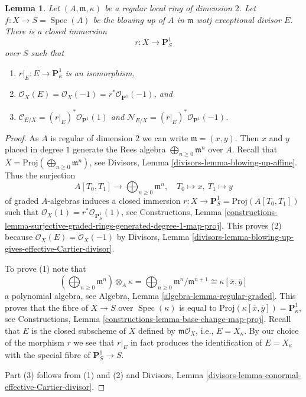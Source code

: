 \documentclass{stacks-project}
\theoremstyle{plain}
\newtheorem{lemma}[subsection]{Lemma}
\theoremstyle{definition}
\theoremstyle{remark}
\numberwithin{equation}{subsection}
\def\Spec{\mathop{\mathrm{Spec}}}
\begin{document}
\begin{lemma}
\label{lemma-blowup}
Let $(A, \mathfrak m, \kappa)$ be a regular local ring of dimension $2$.
Let $f : X \to S = \Spec(A)$ be the blowing up of $A$ in $\mathfrak m$
wotj exceptional divisor $E$. There is a closed immersion
$$
r : X \longrightarrow \mathbf{P}^1_S
$$
over $S$ such that
\begin{enumerate}
\item $r|_E : E \to \mathbf{P}^1_\kappa$ is an isomorphism,
\item $\mathcal{O}_X(E) = \mathcal{O}_X(-1) =
r^*\mathcal{O}_{\mathbf{P}^1}(-1)$, and
\item $\mathcal{C}_{E/X} = (r|_E)^*\mathcal{O}_{\mathbf{P}^1}(1)$ and
$\mathcal{N}_{E/X} = (r|_E)^*\mathcal{O}_{\mathbf{P}^1}(-1)$.
\end{enumerate}
\end{lemma}

\begin{proof}
As $A$ is regular of dimension $2$ we can write $\mathfrak m = (x, y)$.
Then $x$ and $y$ placed in degree $1$ generate the Rees algebra
$\bigoplus_{n \geq 0} \mathfrak m^n$ over $A$. Recall that
$X = \text{Proj}(\bigoplus_{n \geq 0} \mathfrak m^n)$, see
Divisors, Lemma \ref{divisors-lemma-blowing-up-affine}.
Thus the surjection
$$
A[T_0, T_1] \longrightarrow \bigoplus\nolimits_{n \geq 0} \mathfrak m^n,
\quad
T_0 \mapsto x,\ T_1 \mapsto y
$$
of graded $A$-algebras induces a closed immersion
$r : X \to \mathbf{P}^1_S = \text{Proj}(A[T_0, T_1])$
such that $\mathcal{O}_X(1) = r^*\mathcal{O}_{\mathbf{P}^1_S}(1)$, see
Constructions, Lemma
\ref{constructions-lemma-surjective-graded-rings-generated-degree-1-map-proj}.
This proves (2) because $\mathcal{O}_X(E) = \mathcal{O}_X(-1)$
by Divisors, Lemma
\ref{divisors-lemma-blowing-up-gives-effective-Cartier-divisor}.

\medskip\noindent
To prove (1) note that
$$
\left(\bigoplus\nolimits_{n \geq 0} \mathfrak m^n\right) \otimes_A \kappa =
\bigoplus\nolimits_{n \geq 0} \mathfrak m^n/\mathfrak m^{n + 1} \cong
\kappa[\overline{x}, \overline{y}]
$$
a polynomial algebra, see Algebra, Lemma \ref{algebra-lemma-regular-graded}.
This proves that the fibre of $X \to S$ over $\Spec(\kappa)$ is equal to
$\text{Proj}(\kappa[\overline{x}, \overline{y}]) = \mathbf{P}^1_\kappa$, see
Constructions, Lemma \ref{constructions-lemma-base-change-map-proj}.
Recall that $E$ is the closed subscheme of $X$ defined by
$\mathfrak m\mathcal{O}_X$, i.e., $E = X_\kappa$.
By our choice of the morphism $r$ we see that $r|_E$ in fact
produces the identification of $E = X_\kappa$ with the special
fibre of $\mathbf{P}^1_S \to S$.

\medskip\noindent
Part (3) follows from (1) and (2) and Divisors, Lemma
\ref{divisors-lemma-conormal-effective-Cartier-divisor}.
\end{proof}
\end{document}

